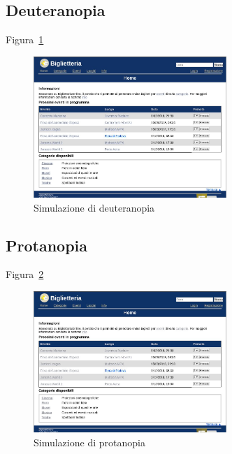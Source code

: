 \documentclass[10pt, a4paper]{article}
\begin{document}
\subsection{Deuteranopia}
Figura~\ref{fig:ldeuteranope}
\begin{figure}[H]
	\centering
	\includegraphics[width=0.65\textwidth]{Images/Deuteranope.jpg}
	\caption{Simulazione di deuteranopia}
	\label{fig:ldeuteranope}
\end{figure}


\subsection{Protanopia}
Figura~\ref{fig:protanope}
\begin{figure}[H]
	\centering
	\includegraphics[width=0.65\textwidth]{Images/Protanope.jpg}
	\caption{Simulazione di protanopia}
	\label{fig:protanope}
\end{figure}
\end{document}
